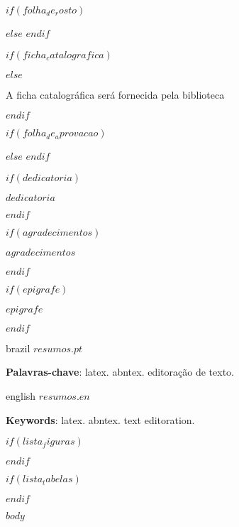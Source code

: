 \documentclass[
	oldfontcommands,
	sumario=abnt-6027-2012,
	12pt,
	openright,
	oneside,
	a4paper,
	english,
	brazil
	]{imecc-unicamp}
\begin{document}
\frenchspacing

\pretextual
\imprimirprimeirafolha

$if(folha_de_rosto)$
  \begin{folhaderosto}
  
  \end{folhaderosto}
$else$
  \imprimirfolhaderosto
$endif$

\begin{fichacatalografica}
  $if(ficha_catalografica)$
    
  $else$
    \begin{center}
  {\ABNTEXchapterfont\large A ficha catalográfica será fornecida pela biblioteca}
    \end{center}
  $endif$
\end{fichacatalografica}

\begin{folhadeaprovacao}
  $if(folha_de_aprovacao)$
    
  $else$
  $endif$
\end{folhadeaprovacao}

$if(dedicatoria)$
  \begin{dedicatoria}
     \vspace*{\fill}
     \centering
     \noindent
     \textit{
        $dedicatoria$
     }
     \vspace*{\fill}
  \end{dedicatoria}
$endif$

$if(agradecimentos)$
  \begin{agradecimentos}
  $agradecimentos$
  \end{agradecimentos}
$endif$

$if(epigrafe)$
  \begin{epigrafe}
      \vspace*{\fill}
      \begin{flushright}
  	\textit{$epigrafe$}
      \end{flushright}
  \end{epigrafe}
  $endif$

\setlength{\absparsep}{18pt}
\begin{resumo}[Resumo]
 \begin{otherlanguage*}{brazil}
    $resumos.pt$

    \textbf{Palavras-chave}: latex. abntex. editoração de texto.
 \end{otherlanguage*}
\end{resumo}
\begin{resumo}[Abstract]
 \begin{otherlanguage*}{english}
    $resumos.en$

    \textbf{Keywords}: latex. abntex. text editoration.
 \end{otherlanguage*}
\end{resumo}

$if(lista_figuras)$
  \listoffigures*
  \cleardoublepage
$endif$

$if(lista_tabelas)$
  \listoftables*
  \cleardoublepage
$endif$

$body$
\end{document}
